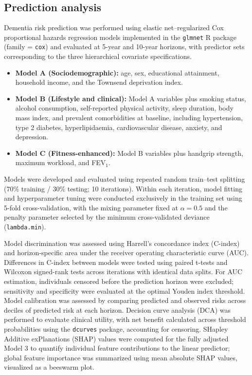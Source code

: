 \documentclass{article}
\begin{document}
\subsection*{Prediction analysis}

Dementia risk prediction was performed using elastic net–regularized Cox proportional hazards regression models implemented in the \texttt{glmnet} R package (family = \texttt{cox}) and evaluated at 5-year and 10-year horizons, with predictor sets corresponding to the three hierarchical covariate specifications. 

\begin{itemize}
    \item \textbf{Model A (Sociodemographic):} age, sex, educational attainment, household income, and the Townsend deprivation index.
    
    \item \textbf{Model B (Lifestyle and clinical):} Model A variables plus smoking status, alcohol consumption, self-reported physical activity, sleep duration, body mass index, and prevalent comorbidities at baseline, including hypertension, type 2 diabetes, hyperlipidaemia, cardiovascular disease, anxiety, and depression.
    
    \item \textbf{Model C (Fitness-enhanced):} Model B variables plus handgrip strength, maximum workload, and FEV$_1$.
\end{itemize}
Models were developed and evaluated using repeated random train--test splitting (70\% training / 30\% testing; 10 iterations). Within each iteration, model fitting and hyperparameter tuning were conducted exclusively in the training set using 5-fold cross-validation, with the mixing parameter fixed at $\alpha = 0.5$ and the penalty parameter selected by the minimum cross-validated deviance (\texttt{lambda.min}).

Model discrimination was assessed using Harrell's concordance index (C-index) and horizon-specific area under the receiver operating characteristic curve (AUC). Differences in C-index between models were tested using paired t-tests and Wilcoxon signed-rank tests across iterations with identical data splits. 
For AUC estimation, individuals censored before the prediction horizon were excluded; sensitivity and specificity were evaluated at the optimal Youden index threshold. Model calibration was assessed by comparing predicted and observed risks across deciles of predicted risk at each horizon. Decision curve analysis (DCA) was performed to evaluate clinical utility, with net benefit calculated across threshold probabilities using the \texttt{dcurves} package, accounting for censoring. SHapley Additive exPlanations (SHAP) values were computed for the fully adjusted Model 3 to quantify individual feature contributions to the linear predictor; global feature importance was summarized using mean absolute SHAP values, visualized as a beeswarm plot.
\end{document}
